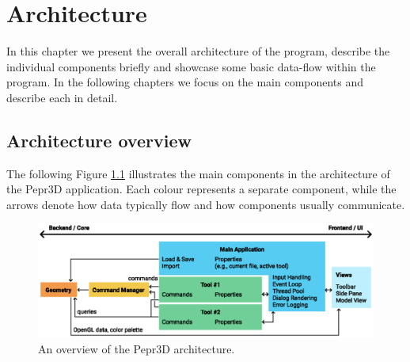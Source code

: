 \chapter{Architecture}

In this chapter we present the overall architecture of the program, describe the individual components briefly and showcase some basic data-flow within the program. In the following chapters we focus on the main components and describe each in detail.



\section{Architecture overview}

The following Figure \ref{fig:architecture} illustrates the main components in the architecture of the Pepr3D application. Each colour represents a separate component, while the arrows denote how data typically flow and how components usually communicate.

\vspace{20pt}

\begin{figure}[h]
	\centering
	\centerline{\includegraphics[scale=1.0]{images/diagram.eps}}
	\caption{An overview of the Pepr3D architecture.}
	\label{fig:architecture}
\end{figure}

